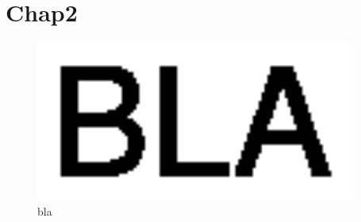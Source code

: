 \section{Chap2}
\begin{figure}[h!]
  \centering
  \includegraphics[width=400px]{gfx/bla}
  \caption{bla}
  \label{fig:bla}
\end{figure}
